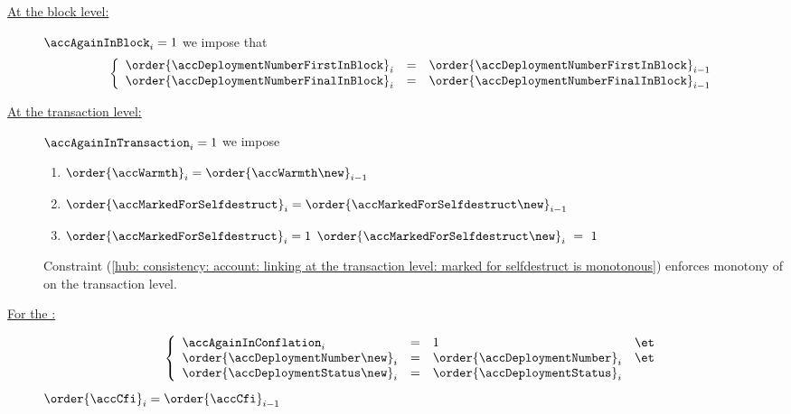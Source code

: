 \begin{description}
	\item[\underline{At the block level:}]
		\If $\accAgainInBlock_{i} = 1$
		\Then we impose that
		\[
			\left\{ \begin{array}{lcl}
				\order{\accDeploymentNumberFirstInBlock} _{i} & = & \order{\accDeploymentNumberFirstInBlock} _{i - 1} \\
				\order{\accDeploymentNumberFinalInBlock} _{i} & = & \order{\accDeploymentNumberFinalInBlock} _{i - 1} \\
			\end{array} \right.
		\]
	\item[\underline{At the transaction level:}]
		\If $\accAgainInTransaction_{i} = 1$
		\Then we impose
		\begin{enumerate}
			\item $\order{\accWarmth}_{i}                = \order{\accWarmth\new}_{i                - 1} $
			\item $\order{\accMarkedForSelfdestruct}_{i} = \order{\accMarkedForSelfdestruct\new}_{i - 1} $
			\item \label{hub: consistency: account: linking at the transaction level: marked for selfdestruct is monotonous} \If $\order{\accMarkedForSelfdestruct}_{i} = 1$ \Then $\order{\accMarkedForSelfdestruct\new}_{i}~=~1$
		\end{enumerate}
		\saNote{}
		Constraint (\ref{hub: consistency: account: linking at the transaction level: marked for selfdestruct is monotonous})
		enforces monotony of \accMarkedForSelfdestruct{} on the transaction level.
	\item[\underline{For the \CFI{}:}]
		\If
		\[
			\left\{ \begin{array}{lclc}
				\accAgainInConflation_{i}             & = & 1                                & \et \\
				\order{\accDeploymentNumber \new}_{i} & = & \order{\accDeploymentNumber}_{i} & \et \\
				\order{\accDeploymentStatus \new}_{i} & = & \order{\accDeploymentStatus}_{i} \\
			\end{array} \right.
		\]
		\Then $\order{\accCfi} _{i} = \order{\accCfi} _{i - 1}$
\end{description}
